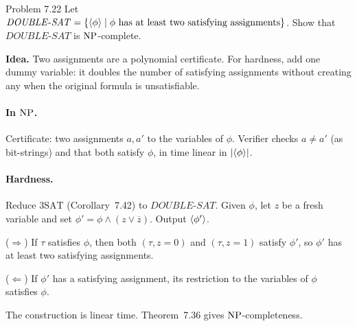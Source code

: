 \begin{question}{Problem 7.22}
Let $\mathit{DOUBLE\text{-}SAT}=\{\langle \phi\rangle\mid \phi\text{ has at least two satisfying assignments}\}$. Show that $\mathit{DOUBLE\text{-}SAT}$ is $\mathrm{NP}$-complete.
\end{question}
\begin{soln}
\textbf{Idea.} Two assignments are a polynomial certificate. For hardness, add one dummy variable: it doubles the number of satisfying assignments without creating any when the original formula is unsatisfiable.

\paragraph{In $\mathrm{NP}$.}
Certificate: two assignments $a,a'$ to the variables of $\phi$. Verifier checks $a\neq a'$ (as bit-strings) and that both satisfy $\phi$, in time linear in $|\langle \phi\rangle|$.

\paragraph{Hardness.}
Reduce $3\mathrm{SAT}$ (Corollary~7.42) to $\mathit{DOUBLE\text{-}SAT}$. Given $\phi$, let $z$ be a fresh variable and set $\phi'=\phi\land(z\lor\overline{z})$. Output $\langle \phi'\rangle$.

($\Rightarrow$) If $\tau$ satisfies $\phi$, then both $(\tau,z=0)$ and $(\tau,z=1)$ satisfy $\phi'$, so $\phi'$ has at least two satisfying assignments.

($\Leftarrow$) If $\phi'$ has a satisfying assignment, its restriction to the variables of $\phi$ satisfies $\phi$.

The construction is linear time. Theorem~7.36 gives $\mathrm{NP}$-completeness.
\end{soln}

